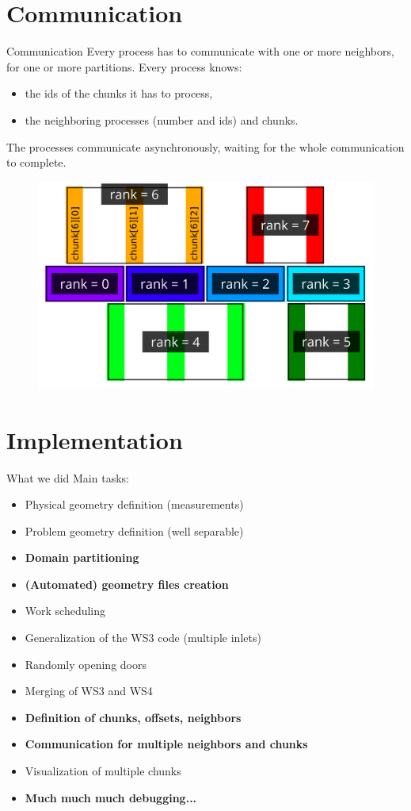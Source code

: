 \documentclass[9pt,pdftex]{beamer}
\begin{document}
\section{Communication}
\begin{frame}{Communication}
  Every process has to communicate with one or more
  neighbors, for one or more partitions. Every process knows:
  \begin{itemize}
   \item the ids of the chunks it has to process,
   \item the neighboring processes (number and ids) and chunks.
  \end{itemize}
  The processes communicate asynchronously, waiting for the whole communication to complete.
 \begin{figure}
  \includegraphics[width=0.6\linewidth]{cpus_divided_chunks}
 \end{figure} 
\end{frame}

\section{Implementation}
\begin{frame}{What we did}
 Main tasks:
 \begin{itemize}
  \item Physical geometry definition (measurements)
  \item Problem geometry definition (well separable)
  \item \textbf{Domain partitioning}
  \item \textbf{(Automated) geometry files creation}
  \item Work scheduling
  \item Generalization of the WS3 code (multiple inlets)
  \item Randomly opening doors
  \item Merging of WS3 and WS4
  \item \textbf{Definition of chunks, offsets, neighbors}
  \item \textbf{Communication for multiple neighbors and chunks}
  \item Visualization of multiple chunks
  \pause
  \item \textbf{Much much much debugging...}
 \end{itemize}
\end{frame}
\end{document}

